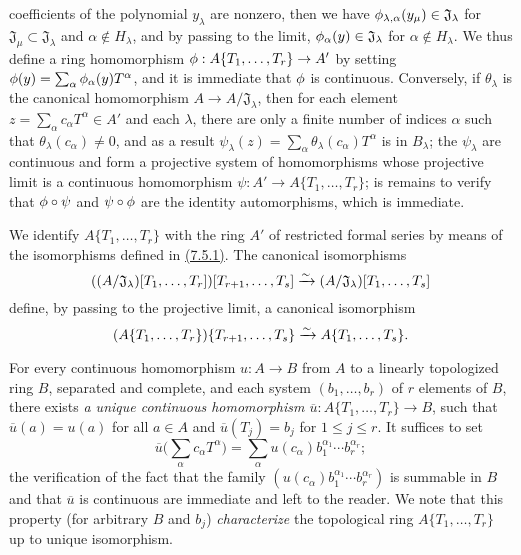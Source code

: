 \begin{env}[7.5.1]
coefficients of the polynomial $y_\lambda$ are nonzero, then we have
$\phi_{\lambda,\alpha}(y_\mu)\in\mathfrak{J}_\lambda$ for
$\mathfrak{J}_\mu\subset\mathfrak{J}_\lambda$ and $\alpha\not\in H_\lambda$, and by
passing to the limit, $\phi_\alpha(y)\in\mathfrak{J}_\lambda$ for
$\alpha\not\in H_\lambda$. We thus define a ring homomorphism
$\phi:A\{T_1,\dots,T_r\}\to A'$ by setting
$\phi(y)=\sum_\alpha\phi_\alpha(y)T^\alpha$, and it is immediate that $\phi$ is
continuous. Conversely, if $\theta_\lambda$ is the canonical homomorphism
$A\to A/\mathfrak{J}_\lambda$, then for each element
$z=\sum_\alpha c_\alpha T^\alpha\in A'$ and each $\lambda$, there are only a finite
number of indices $\alpha$ such that $\theta_\lambda(c_\alpha)\neq 0$, and as a
result $\psi_\lambda(z)=\sum_\alpha\theta_\lambda(c_\alpha)T^\alpha$ is in
$B_\lambda$; the $\psi_\lambda$ are continuous and form a projective system of
homomorphisms whose projective limit is a continuous homomorphism
$\psi:A'\to A\{T_1,\dots,T_r\}$; is remains to verify that $\phi\circ\psi$ and
$\psi\circ\phi$ are the identity automorphisms, which is immediate.
\end{env}

\begin{env}[7.5.2]
\label{0.7.5.2}
We identify $A\{T_1,\dots,T_r\}$ with the ring $A'$ of restricted formal series by
means of the isomorphisms defined in \hyperref[0.7.5.1]{(7.5.1)}. The canonical
isomorphisms
\[
  ((A/\mathfrak{J}_\lambda)[T_1,\dots,T_r])[T_{r+1},\dots,T_s]
  \xrightarrow{\sim}(A/\mathfrak{J}_\lambda)[T_1,\dots,T_s]
\]
define, by passing to the projective limit, a canonical isomorphism
\[
  (A\{T_1,\dots,T_r\})\{T_{r+1},\dots,T_s\}
  \xrightarrow{\sim} A\{T_1,\dots,T_s\}.
\]
\end{env}

\begin{env}[7.5.3]
\label{0.7.5.3}
For every continuous homomorphism $u:A\to B$ from $A$ to a linearly topologized ring
$B$, separated and complete, and each system $(b_1,\dots,b_r)$ of $r$ elements of $B$,
there exists {\em a unique continuous homomorphism $\overline{u}:A\{T_1,\dots,T_r\}\to B$},
such that $\overline{u}(a)=u(a)$ for all $a\in A$ and $\overline{u}(T_j)=b_j$ for
$1\leqslant j\leqslant r$. It suffices to set
\[
  \overline{u}\big(\sum_\alpha c_\alpha T^\alpha\big)
  =\sum_\alpha u(c_\alpha)b_1^{\alpha_1}\cdots b_r^{\alpha_r};
\]
the verification of the fact that the family $(u(c_\alpha)b_1^{\alpha_1}\cdots b_r^{\alpha_r})$
is summable in $B$ and that $\overline{u}$ is continuous are immediate and left to the
reader. We note that this property (for arbitrary $B$ and $b_j$) {\em characterize} the
topological ring $A\{T_1,\dots,T_r\}$ up to unique isomorphism.
\end{env}

